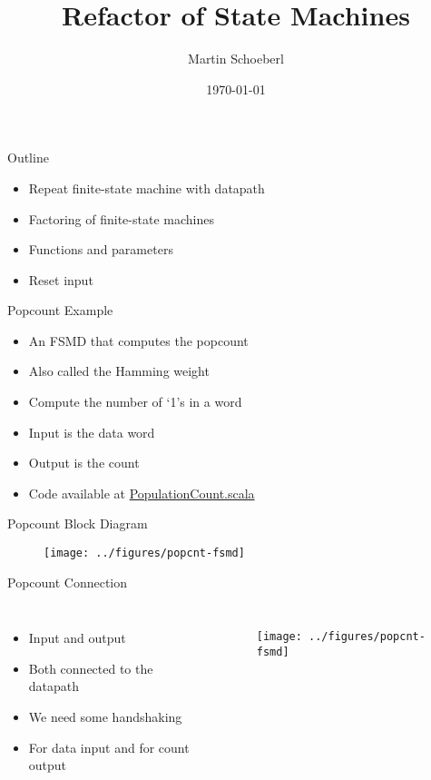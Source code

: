 

\newif\ifbook


\title{Refactor of State Machines}
\author{Martin Schoeberl}
\date{\today}



\begin{frame}
\titlepage
\end{frame}

\begin{frame}[fragile]{Outline}
\begin{itemize}
\item Repeat finite-state machine with datapath
\item Factoring of finite-state machines
\item Functions and parameters
\item Reset input
\end{itemize}
\end{frame}

\begin{frame}[fragile]{Popcount Example}
\begin{itemize}
\item An FSMD that computes the popcount
\item Also called the Hamming weight
\item Compute the number of `1's in a word
\item Input is the data word
\item Output is the count
\item Code available at \href{https://github.com/schoeberl/chisel-book/blob/master/src/main/scala/PopulationCount.scala}{PopulationCount.scala}
\end{itemize}
\end{frame}

\begin{frame}[fragile]{Popcount Block Diagram}

\begin{figure}
  \texttt{[image: ../figures/popcnt-fsmd]}
\end{figure}
\end{frame}


\begin{frame}[fragile]{Popcount Connection}
\begin{columns}
\begin{itemize}
\item Input  and output 
\item Both connected to the datapath
\item We need some handshaking
\item For data input and for count output
\end{itemize}
\begin{figure}
  \texttt{[image: ../figures/popcnt-fsmd]}
\end{figure}
\end{columns}
\end{frame}

